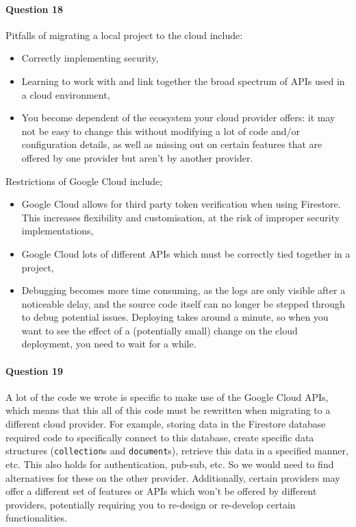 \documentclass{ds-report}
\begin{document}
	\paragraph{Question 18} 
	Pitfalls of migrating a local project to the cloud include:
	\begin{itemize}
		\item Correctly implementing security,
		\item Learning to work with and link together the broad spectrum of APIs used in a cloud environment,
		\item You become dependent of the ecosystem your cloud provider offers: it may not be easy to change this without modifying a lot of code and/or configuration details, as well as missing out on certain features that are offered by one provider but aren't by another provider.
	\end{itemize}
	Restrictions of Google Cloud include;
	\begin{itemize}
		\item Google Cloud allows for third party token verification when using Firestore. This increases flexibility and customisation, at the risk of improper security implementations,
		\item Google Cloud lots of different APIs which must be correctly tied together in a project,
		\item Debugging becomes more time consuming, as the logs are only visible after a noticeable delay, and the source code itself can no longer be stepped through to debug potential issues. Deploying takes around a minute, so when you want to see the effect of a (potentially small) change on the cloud deployment, you need to wait for a while.
	\end{itemize}
	
	\paragraph{Question 19} 
	A lot of the code we wrote is specific to make use of the Google Cloud APIs, which means that this all of this code must be rewritten when migrating to a different cloud provider. For example, storing data in the Firestore database required code to specifically connect to this database, create specific data structures (\texttt{collection}s and \texttt{document}s), retrieve this data in a specified manner, etc. This also holds for authentication, pub-sub, etc. So we would need to find alternatives for these on the other provider.
	Additionally, certain providers may offer a different set of features or APIs which won't be offered by different providers, potentially requiring you to re-design or re-develop certain functionalities.
	
\end{document}
